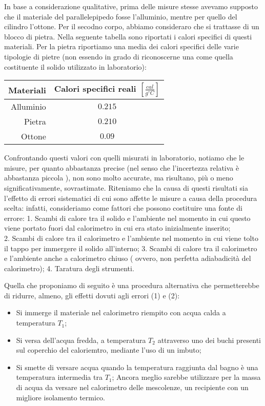 \documentclass[11pt]{article}
\providecommand{\tightlist}{%
      \setlength{\itemsep}{0pt}\setlength{\parskip}{0pt}}
\begin{document}
In base a considerazione qualitative, prima delle misure stesse avevamo
supposto che il materiale del parallelepipedo fosse l'alluminio, mentre
per quello del cilindro l'ottone. Per il secodno corpo, abbiamo
consideraro che si trattasse di un blocco di pietra. Nella seguente
tabella sono riportati i calori specifici di questi materiali. Per la
pietra riportiamo una media dei calori specifici delle varie tipologie
di pietre (non essendo in grado di riconoscerne una come quella
costituente il solido utilizzato in laboratorio):

\begin{longtable}[]{@{}rc@{}}
\toprule
Materiali & Calori specifici reali
\([\frac{cal}{g^\circ C}]\)\tabularnewline
\midrule
\endhead
Alluminio & \(0.215\)\tabularnewline
Pietra & \(0.210\)\tabularnewline
Ottone & \(0.09\)\tabularnewline
\bottomrule
\end{longtable}

Confrontando questi valori con quelli misurati in laboratorio, notiamo
che le misure, per quanto abbastanza precise (nel senso che l'incertezza
relativa è abbastanza piccola ), non sono molto accurate, ma risultano,
più o meno significativamente, sovrastimate. Riteniamo che la causa di
questi risultati sia l'effetto di errori sistematici di cui sono affette
le misure a causa della procedura scelta: infatti, consideriamo come
fattori che possono costituire una fonte di errore: 1. Scambi di calore
tra il solido e l'ambiente nel momento in cui questo viene portato fuori
dal calorimetro in cui era stato inizialmente inserito;\\
2. Scambi di calore tra il calorimetro e l'ambiente nel momento in cui
viene tolto il tappo per immergere il solido all'interno; 3. Scambi di
calore tra il calorimetro e l'ambiente anche a calorimetro chiuso (
ovvero, non perfetta adiabadicità del calorimetro); 4. Taratura degli
strumenti.

Quella che proponiamo di seguito è una procedura alternativa che
permetterebbe di ridurre, almeno, gli effetti dovuti agli errori (1) e
(2):

\begin{itemize}
\tightlist
\item
  Si immerge il materiale nel calorimetro riempito con acqua calda a
  temperatura \(T_{1}\);\\
\item
  Si versa dell'acqua fredda, a temperatura \(T_{2}\) attraverso uno dei
  buchi presenti sul coperchio del caloriemtro, mediante l'uso di un
  imbuto;
\item
  Si smette di versare acqua quando la temperatura raggiunta dal bagno è
  una temperatura intermedia tra \(T_{1}\); Ancora meglio sarebbe
  utilizzare per la massa di acqua da versare nel calorimetro delle
  mescolenze, un recipiente con un migliore isolamento termico.
\end{itemize}
\end{document}
